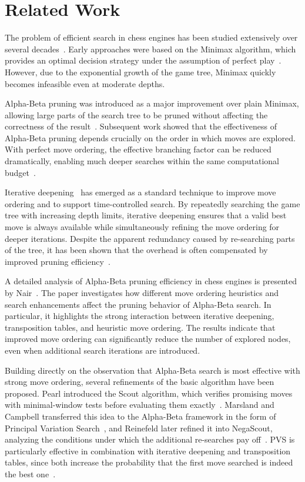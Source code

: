\section{Related Work}
\label{sec:related_work}

The problem of efficient search in chess engines has been studied extensively
over several decades~\cite{marsland1986review}. Early approaches were based on the Minimax algorithm,
which provides an optimal decision strategy under the assumption of perfect
play~\cite{yannakakis2018artificial}. However, due to the exponential growth of the game tree, Minimax quickly becomes infeasible even at moderate depths.

Alpha-Beta pruning was introduced as a major improvement over plain Minimax,
allowing large parts of the search tree to be pruned without affecting the
correctness of the result~\cite{knuth1975alphabeta}. Subsequent work showed that
the effectiveness of Alpha-Beta pruning depends crucially on the order in which
moves are explored. With perfect move ordering, the effective branching factor can be reduced dramatically, enabling much deeper searches within the same computational budget~\cite{marsland1986review}.

Iterative deepening~\cite{korf1985iterative} has emerged as a standard technique to improve move ordering
and to support time-controlled search. By repeatedly searching the game tree with
increasing depth limits, iterative deepening ensures that a valid best move is
always available while simultaneously refining the move ordering for deeper
iterations. Despite the apparent redundancy caused by re-searching parts of the
tree, it has been shown that the overhead is often compensated by improved
pruning efficiency~\cite{marsland1986review}.

A detailed analysis of Alpha-Beta pruning efficiency in chess engines is
presented by Nair~\cite{nair_improving_ab}. The paper investigates how different
move ordering heuristics and search enhancements affect the pruning behavior of
Alpha-Beta search. In particular, it highlights the strong interaction between
iterative deepening, transposition tables, and heuristic move ordering. The
results indicate that improved move ordering can significantly reduce the number
of explored nodes, even when additional search iterations are introduced.

Building directly on the observation that Alpha-Beta search is most effective
with strong move ordering, several refinements of the basic algorithm have been
proposed. Pearl introduced the Scout algorithm, which verifies promising moves with
minimal-window tests before evaluating them exactly~\cite{pearl1980scout}.
Marsland and Campbell transferred this idea to the Alpha-Beta framework in the
form of Principal Variation Search~\cite{marsland1982parallel}, and Reinefeld
later refined it into NegaScout, analyzing the conditions under which the
additional re-searches pay off~\cite{reinefeld1983negascout}. PVS is
particularly effective in combination with iterative deepening and
transposition tables, since both increase the probability that the first move
searched is indeed the best one~\cite{marsland1986review}.

